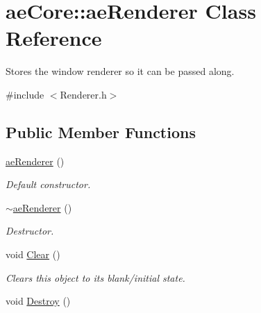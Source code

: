 \hypertarget{classae_core_1_1ae_renderer}{}\section{ae\+Core\+:\+:ae\+Renderer Class Reference}
\label{classae_core_1_1ae_renderer}


Stores the window renderer so it can be passed along.  




{\ttfamily \#include $<$Renderer.\+h$>$}

\subsection*{Public Member Functions}
\begin{DoxyCompactItemize}
\item 
\hyperlink{classae_core_1_1ae_renderer_aa98c12f7aeba64e6cd32856ce35b26f4}{ae\+Renderer} ()\hypertarget{classae_core_1_1ae_renderer_aa98c12f7aeba64e6cd32856ce35b26f4}{}\label{classae_core_1_1ae_renderer_aa98c12f7aeba64e6cd32856ce35b26f4}

\begin{DoxyCompactList}\small\item\em Default constructor. \end{DoxyCompactList}\item 
\hyperlink{classae_core_1_1ae_renderer_ac336fe39ee36736b5cfbf47c665a5ad2}{$\sim$ae\+Renderer} ()\hypertarget{classae_core_1_1ae_renderer_ac336fe39ee36736b5cfbf47c665a5ad2}{}\label{classae_core_1_1ae_renderer_ac336fe39ee36736b5cfbf47c665a5ad2}

\begin{DoxyCompactList}\small\item\em Destructor. \end{DoxyCompactList}\item 
void \hyperlink{classae_core_1_1ae_renderer_ad274612bff58ca4707d7e573e48bc0cd}{Clear} ()\hypertarget{classae_core_1_1ae_renderer_ad274612bff58ca4707d7e573e48bc0cd}{}\label{classae_core_1_1ae_renderer_ad274612bff58ca4707d7e573e48bc0cd}

\begin{DoxyCompactList}\small\item\em Clears this object to its blank/initial state. \end{DoxyCompactList}\item 
void \hyperlink{classae_core_1_1ae_renderer_afbc2091d48c14b36f25a2f42b1ff5b04}{Destroy} ()\hypertarget{classae_core_1_1ae_renderer_afbc2091d48c14b36f25a2f42b1ff5b04}{}\label{classae_core_1_1ae_renderer_afbc2091d48c14b36f25a2f42b1ff5b04}


\end{DoxyCompactItemize}
